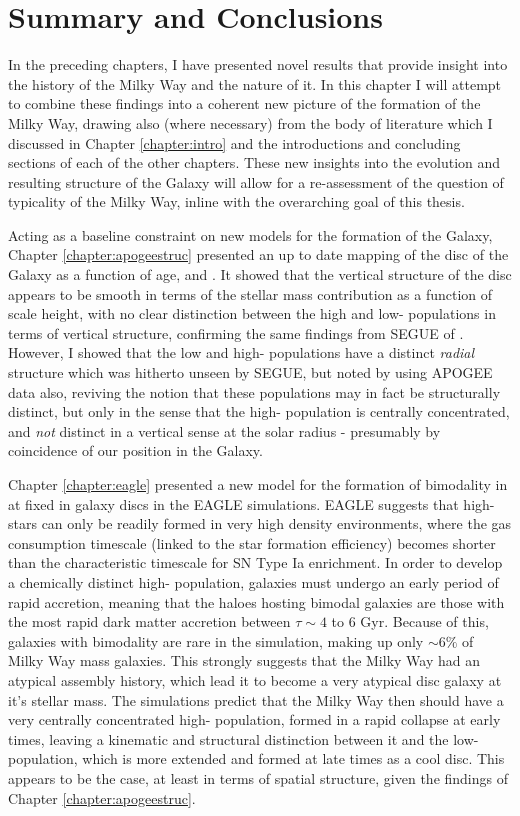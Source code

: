 \chapter{Summary and Conclusions}

In the preceding chapters, I have presented novel results that provide insight into the history of the Milky Way and the nature of it. In this chapter I will attempt to combine these findings into a coherent new picture of the formation of the Milky Way, drawing also (where necessary) from the body of literature which I discussed in Chapter \ref{chapter:intro} and the introductions and concluding sections of each of the other chapters. These new insights into the evolution and resulting structure of the Galaxy will allow for a re-assessment of the question of typicality of the Milky Way, inline with the overarching goal of this thesis. 

Acting as a baseline constraint on new models for the formation of the Galaxy, Chapter \ref{chapter:apogeestruc} presented an up to date mapping of the disc of the Galaxy as a function of age, \feh{} and \afe{}. It showed that the vertical structure of the disc appears to be smooth in terms of the stellar mass contribution as a function of scale height, with no clear distinction between the high and low-\afe{} populations in terms of vertical structure, confirming the same findings from SEGUE of \citet{2012ApJ...751..131B}. However, I showed that the low and high-\afe{} populations have a distinct \emph{radial} structure which was hitherto unseen by SEGUE, but noted by \citet{2016ApJ...823...30B} using APOGEE data also, reviving the notion that these populations may in fact be structurally distinct, but only in the sense that the high-\afe{} population is centrally concentrated, and \emph{not} distinct in a vertical sense at the solar radius - presumably by coincidence of our position in the Galaxy. 

Chapter \ref{chapter:eagle} presented a new model for the formation of bimodality in \afe{} at fixed \feh{} in galaxy discs in the EAGLE simulations. EAGLE suggests that high-\afe{} stars can only be readily formed in very high density environments, where the gas consumption timescale (linked to the star formation efficiency) becomes shorter than the characteristic timescale for SN Type Ia enrichment. In order to develop a chemically distinct high-\afe{} population, galaxies must undergo an early period of rapid accretion, meaning that the haloes hosting bimodal galaxies are those with the most rapid dark matter accretion between $\tau \sim 4$ to $6$ Gyr. Because of this, galaxies with \afe{} bimodality are rare in the simulation, making up only $\sim 6\%$ of Milky Way mass galaxies. This strongly suggests that the Milky Way had an atypical assembly history, which lead it to become a very atypical disc galaxy at it's stellar mass. The simulations predict that the Milky Way then should have a very centrally concentrated high-\afe{} population, formed in a rapid collapse at early times, leaving a kinematic and structural distinction between it and the low-\afe{} population, which is more extended and formed at late times as a cool disc. This appears to be the case, at least in terms of spatial structure, given the findings of Chapter \ref{chapter:apogeestruc}.

